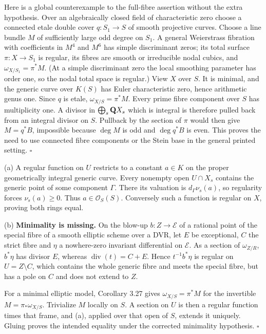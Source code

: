 \documentclass[11pt]{article}
\let\chapterexercise\exercise
\renewcommand{\exercise}[2]{\Needspace{8\baselineskip}\chapterexercise{#1}{#2}}
\begin{document}
Here is a global counterexample to the full-fibre assertion without the extra hypothesis. Over an algebraically closed field of characteristic zero choose a connected etale double cover $q:S_1\to S$ of smooth projective curves. Choose a line bundle $M$ of sufficiently large odd degree on $S_1$. A general Weierstrass fibration with coefficients in $M^4$ and $M^6$ has simple discriminant zeros; its total surface $\pi:X\to S_1$ is regular, its fibres are smooth or irreducible nodal cubics, and $\omega_{X/S_1}=\pi^*M$. (At a simple discriminant zero the local smoothing parameter has order one, so the nodal total space is regular.) View $X$ over $S$. It is minimal, and the generic curve over $K(S)$ has Euler characteristic zero, hence arithmetic genus one. Since $q$ is etale, $\omega_{X/S}=\pi^*M$. Every prime fibre component over $S$ has multiplicity one. A divisor in $\bigoplus_s\mathbf Q X_s$ which is integral is therefore pulled back from an integral divisor on $S$. Pullback by the section of $\pi$ would then give $M=q^*B$, impossible because $\deg M$ is odd and $\deg q^*B$ is even. This proves the need to use connected fibre components or the Stein base in the general printed setting. \hfill$\square$

\pf (a) A regular function on $U$ restricts to a constant $a\in K$ on the proper geometrically integral generic curve. Every nonempty open $U\cap X_s$ contains the generic point of some component $\Gamma$. There its valuation is $d_\Gamma\nu_s(a)$, so regularity forces $\nu_s(a)\ge0$. Thus $a\in\mathcal O_S(S)$. Conversely such a function is regular on $X$, proving both rings equal.

(b) \textbf{Minimality is missing.} On the blow-up $b:Z\to\mathcal E$ of a rational point of the special fibre of a smooth elliptic scheme over a DVR, let $E$ be exceptional, $C$ the strict fibre and $\eta$ a nowhere-zero invariant differential on $\mathcal E$. As a section of $\omega_{Z/R}$, $b^*\eta$ has divisor $E$, whereas $\operatorname{div}(t)=C+E$. Hence $t^{-1}b^*\eta$ is regular on $U=Z\setminus C$, which contains the whole generic fibre and meets the special fibre, but has a pole on $C$ and does not extend to $Z$.

For a minimal elliptic model, Corollary 3.27 gives $\omega_{X/S}=\pi^*M$ for the invertible $M=\pi_*\omega_{X/S}$. Trivialize $M$ locally on $S$. A section on $U$ is then a regular function times that frame, and (a), applied over that open of $S$, extends it uniquely. Gluing proves the intended equality under the corrected minimality hypothesis. \hfill$\square$
\end{document}
